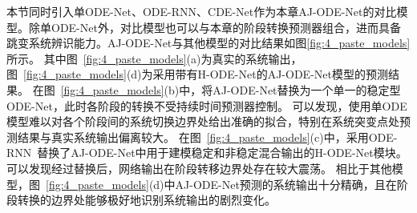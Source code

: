 本节同时引入单ODE-Net、ODE-RNN\cite{10.5555/3454287.3454765}、CDE-Net\cite{kidger2020neural}作为本章AJ-ODE-Net的对比模型。除单ODE-Net外，对比模型也可以与本章的阶段转换预测器组合，进而具备跳变系统辨识能力。AJ-ODE-Net与其他模型的对比结果如图\ref{fig:4_paste_models}所示。
其中图~\ref{fig:4_paste_models}(a)为真实的系统输出，图~\ref{fig:4_paste_models}(d)为采用带有H-ODE-Net的AJ-ODE-Net模型的预测结果。
在图~\ref{fig:4_paste_models}(b)中，将AJ-ODE-Net替换为一个单一的稳定型ODE-Net，此时各阶段的转换不受持续时间预测器控制。
可以发现，使用单ODE模型难以对各个阶段间的系统切换边界处给出准确的拟合，特别在系统突变点处预测结果与真实系统输出偏离较大。
在图~\ref{fig:4_paste_models}(c)中，采用ODE-RNN~\cite{10.5555/3454287.3454765}替换了AJ-ODE-Net中用于建模稳定和非稳定混合输出的H-ODE-Net模块。
可以发现经过替换后，网络输出在阶段转移边界处存在较大震荡。
相比于其他模型，图~\ref{fig:4_paste_models}(d)中AJ-ODE-Net预测的系统输出十分精确，且在阶段转换的边界处能够极好地识别系统输出的剧烈变化。
